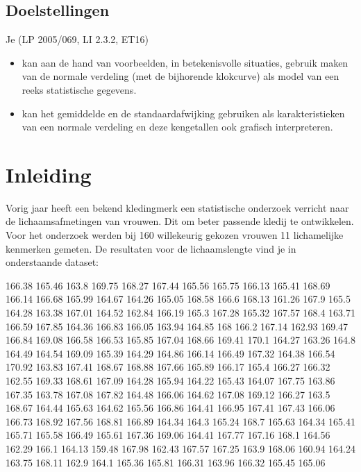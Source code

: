\documentclass[12pt,twoside]{article}
\begin{document}
\subsection*{Doelstellingen}
{\singlespacing
Je \hfill  {\scriptsize(LP 2005/069, LI 2.3.2, ET16)}
\begin{itemize}
  \item kan aan de hand van voorbeelden, in betekenisvolle situaties, gebruik maken van de normale verdeling (met de bijhorende klokcurve) als model van een reeks statistische gegevens.
  \item kan het gemiddelde en de standaardafwijking gebruiken als karakteristieken van een normale verdeling en deze kengetallen ook grafisch interpreteren.
\end{itemize}

\thispagestyle{empty}
\mbox{}
\newpage
\clearpage
\thispagestyle{empty}
\mbox{}
\newpage
\clearpage
{} 

\fancyhead[RE,LO]{}

\onehalfspacing

\section{Inleiding}

Vorig jaar heeft een bekend kledingmerk een statistische onderzoek verricht naar de lichaamsafmetingen van vrouwen. Dit om beter passende kledij te ontwikkelen. Voor het onderzoek werden bij 160 willekeurig gekozen vrouwen 11 lichamelijke kenmerken gemeten. De resultaten voor de lichaamslengte vind je in onderstaande dataset:

\begin{center}  
\singlespacing
\scriptsize
166.38
165.46
163.8
169.75
168.27
167.44
165.56
165.75
166.13
165.41
168.69
166.14
166.68
165.99
164.67
164.26
165.05
168.58
166.6
168.13
161.26
167.9
165.5
164.28
163.38
167.01
164.52
162.84
166.19
165.3
167.28
165.32
167.57
168.4
163.71
166.59
167.85
164.36
166.83
166.05
163.94
164.85
168
166.2
167.14
162.93
169.47
166.84
169.08
166.58
166.53
165.85
167.04
168.66
169.41
170.1
164.27
163.26
164.8
164.49
164.54
169.09
165.39
164.29
164.86
166.14
166.49
167.32
164.38
166.54
170.92
163.83
167.41
168.67
168.88
167.66
165.89
166.17
165.4
166.27
166.32
162.55
169.33
168.61
167.09
164.28
165.94
164.22
165.43
164.07
167.75
163.86
167.35
163.78
167.08
167.82
164.48
166.06
164.62
167.08
169.12
166.27
163.5
168.67
164.44
165.63
164.62
165.56
166.86
164.41
166.95
167.41
167.43
166.06
166.73
168.92
167.56
168.81
166.89
164.34
164.3
165.24
168.7
165.63
164.34
165.41
165.71
165.58
166.49
165.61
167.36
169.06
164.41
167.77
167.16
168.1
164.56
162.29
166.1
164.13
159.48
167.98
162.43
167.57
167.25
163.9
168.06
160.94
164.24
163.75
168.11
162.9
164.1
165.36
165.81
166.31
163.96
166.32
165.45
165.06
\end{center}

}
\end{document}
